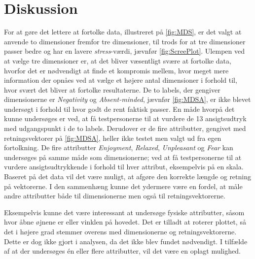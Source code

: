 \section*{Diskussion}
\label{Diskussion}
%
For at gøre det lettere at fortolke data, illustreret på \autoref{fig:MDS}, er det valgt at anvende to dimensioner fremfor tre dimensioner, til trods for at tre dimensioner passer bedre og har en lavere \textit{stress}-værdi, jævnfør \autoref{fig:ScreePlot}. Ulempen ved at vælge tre dimensioner er, at det bliver væsentligt svære at fortolke data, hvorfor det er nødvendigt at finde et kompromis mellem, hvor meget mere information der opnåes ved at vælge et højere antal dimensioner i forhold til, hvor svært det bliver at fortolke resultaterne. \blankline
%
De to labels, der gengiver dimensionerne er \textit{Negativity} og \textit{Absent-minded}, jævnfør \autoref{fig:MDSA}, er ikke blevet undersøgt i forhold til hvor godt de rent faktisk passer. En måde hvorpå det kunne undersøges er ved, at få testpersonerne til at vurdere de 13 ansigtsudtryk med udgangspunkt i de to labels. Derudover er de fire attributter, gengivet med retningsvektorer på \autoref{fig:MDSA}, heller ikke testet men valgt ud fra egen fortolkning. De fire attributter \textit{Enjoyment}, \textit{Relaxed}, \textit{Unpleasant} og \textit{Fear} kan undersøges på samme måde som dimensionerne; ved at få testpersonerne til at vurdere ansigtsudtrykkende i forhold til hver attribut, eksempelvis på en skala. Baseret på det data vil det være muligt, at afgøre den korrekte længde og retning på vektorerne. I den sammenhæng kunne det ydermere være en fordel, at måle andre attributter både til dimensionerne men også til retningsvektorerne. 

Eksempelvis kunne det være interessant at undersøge fysiske attributter, såsom hvor åbne øjnene er eller vinklen på hovedet.\blankline     
%
Det er tilladt at roterer plottet, så det i højere grad stemmer overens med dimensionerne og retningsvektorerne. Dette er dog ikke gjort i analysen, da det ikke blev fundet nødvendigt. I tilfælde af at der undersøges én eller flere attributter, vil det være en oplagt mulighed.